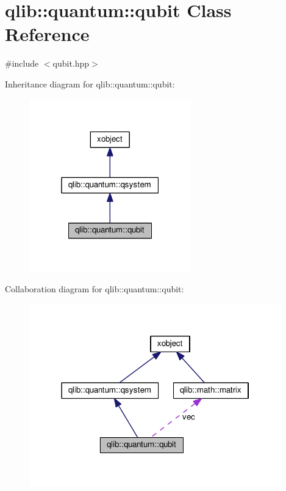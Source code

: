 \hypertarget{classqlib_1_1quantum_1_1qubit}{}\section{qlib\+:\+:quantum\+:\+:qubit Class Reference}
\label{classqlib_1_1quantum_1_1qubit}


{\ttfamily \#include $<$qubit.\+hpp$>$}



Inheritance diagram for qlib\+:\+:quantum\+:\+:qubit\+:\nopagebreak
\begin{figure}[H]
\begin{center}
\leavevmode
\includegraphics[width=199pt]{classqlib_1_1quantum_1_1qubit__inherit__graph}
\end{center}
\end{figure}


Collaboration diagram for qlib\+:\+:quantum\+:\+:qubit\+:\nopagebreak
\begin{figure}[H]
\begin{center}
\leavevmode
\includegraphics[width=310pt]{classqlib_1_1quantum_1_1qubit__coll__graph}
\end{center}
\end{figure}
